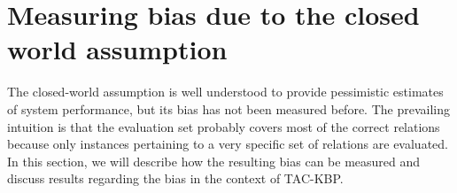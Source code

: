 \section{Measuring bias due to the closed world assumption}
\label{sec:analysis}


The closed-world assumption is well understood to provide pessimistic estimates of system performance, but its bias has not been measured before.
The prevailing intuition is that the evaluation set probably covers most of the correct relations because only instances pertaining to a very specific set of relations are evaluated.
In this section, we will describe how the resulting bias can be measured and discuss results regarding the bias in the context of TAC-KBP.\@


